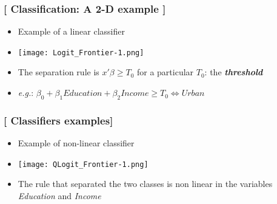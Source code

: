 \documentclass[xcolor=x11names,compress, aspectratio=169]{beamer}
\renewcommand{\(}{\begin{columns}}
\renewcommand{\)}{\end{columns}}
\newcommand{\<}[1]{\begin{column}{#1}}
\renewcommand{\>}{\end{column}}
\begin{document}
\begin{frame} %
\frametitle{\textcolor{brique}{[ Classification:  A 2-D example ]}}
\pause
\begin{itemize}[<+->]
  \item Example of a linear classifier
  \item[] \begin{center}\texttt{[image: Logit\_Frontier-1.png]} \end{center}
  \item The separation rule is  $ x'\beta \geq T_0$ for a particular $T_0$: the \textbf{\textit{threshold}}
  \item[]\textit{e.g.}: \hspace{0.5cm} $\beta_0 + \beta_1 Education + \beta_2 Income \geq T_0  \Leftrightarrow Urban$

\end{itemize}
\end{frame}

\begin{frame} %
\frametitle{\textcolor{brique}{[ Classifiers examples]}}
\pause
\begin{itemize}[<+->]
  \item Example of non-linear classifier
  \item[] \begin{center}\texttt{[image: QLogit\_Frontier-1.png]} \end{center}
  \item The rule that separated the two classes is non linear in the variables \textit{Education}  and \textit{Income}
\end{itemize}
\end{frame}

\end{document}
